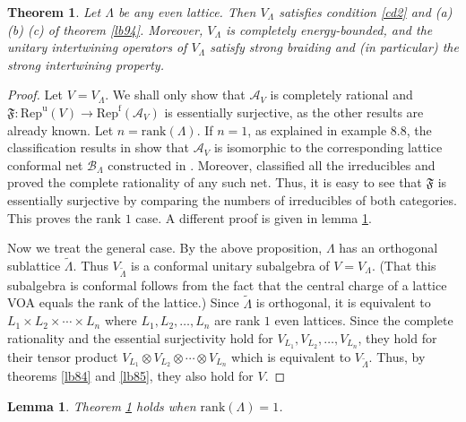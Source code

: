 \documentclass[12pt,a4paper]{article}
\theoremstyle{definition}
\theoremstyle{plain}
\newtheorem{thm}[df]{Theorem}
\newtheorem{lm}[df]{Lemma}
\newcommand{\fk}{\mathfrak}
\newcommand{\mc}{\mathcal}
\newcommand{\wtd}{\widetilde}
\newcommand{\Repu}{\mathrm{Rep}^{\mathrm u}}
\newcommand{\Repf}{\mathrm{Rep}^{\mathrm f}}
\newcommand{\rank}{\mathrm{rank}}
\numberwithin{equation}{subsection}
\begin{document}
\begin{thm}\label{lb96}
Let $\Lambda$ be any even lattice. Then $V_\Lambda$ satisfies condition \ref{cd2} and (a) (b) (c) of theorem \ref{lb94}. Moreover, $V_\Lambda$ is completely energy-bounded, and the unitary intertwining operators of $V_\Lambda$ satisfy strong braiding and (in particular) the strong intertwining property.
\end{thm}

\begin{proof}
Let $V=V_\Lambda$. We shall only show that $\mc A_V$ is completely rational and $\fk F:\Repu(V)\rightarrow\Repf(\mc A_V)$ is essentially surjective, as the other results are already known. Let $n=\rank(\Lambda)$. If $n=1$, as explained in \cite{CKLW18} example 8.8,  the classification results in \cite{BMT88} show that $\mc A_V$ is isomorphic to the corresponding  lattice conformal net $\mc B_\Lambda$ constructed in \cite{DX06}. Moreover, \cite{DX06} classified all the irreducibles  and proved the complete rationality of any such net.  Thus, it is easy to see that $\fk F$ is essentially surjective by comparing the numbers of irreducibles of both categories. This proves the rank $1$ case. A different proof is given in lemma \ref{lb95}.

Now we treat the general case. By the above proposition, $\Lambda$ has an orthogonal sublattice $\wtd \Lambda$. Thus $V_{\wtd\Lambda}$ is a conformal unitary subalgebra of $V=V_\Lambda$. (That this subalgebra is conformal follows from the fact that the central charge of a lattice VOA equals the rank of the lattice.) Since $\wtd\Lambda$ is orthogonal, it is equivalent to $L_1\times L_2\times\cdots\times L_n$ where $L_1,L_2,\dots,L_n$ are rank $1$ even lattices. Since the complete rationality and the essential surjectivity hold for $V_{L_1},V_{L_2},\dots,V_{L_n}$, they hold for their tensor product $V_{L_1}\otimes V_{L_2}\otimes\cdots\otimes V_{L_n}$ which is equivalent to $V_{\wtd \Lambda}$. Thus, by theorems \ref{lb84} and \ref{lb85}, they also hold for $V$.
\end{proof}


\begin{lm}\label{lb95}
Theorem \ref{lb96} holds when $\rank(\Lambda)=1$.
\end{lm}
\end{document}
